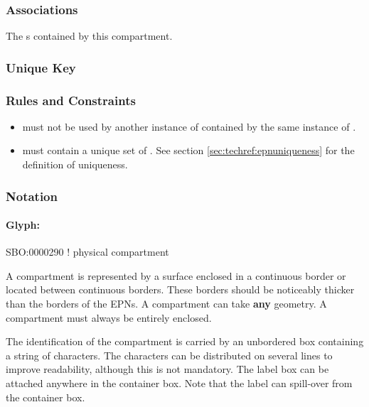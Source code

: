 \subsubsection{Associations}

\begin{attributes}
   The
  s contained by this compartment.
\end{attributes}

\subsubsection{Unique Key}

\begin{logicalkey}
  \item {}
  \item {}
\end{logicalkey}

\subsubsection{Rules and Constraints}

\begin{itemize}
\item {} must not be used by another instance of
   contained by the same instance of
  .
\item {} must contain a unique set of
  . See section \ref{sec:techref:epnuniqueness} for
  the definition of  uniqueness.
\end{itemize}

\subsubsection{Notation}

\paragraph{Glyph: }\label{sec:techref:compartment}

\begin{glyphDescription}

\glyphSboTerm  SBO:0000290 ! physical compartment

\glyphContainer A compartment is represented by a surface enclosed in a continuous border or located between continuous borders. These borders should be noticeably thicker than the borders of the EPNs. A compartment can take \textbf{any} geometry. A compartment must always be entirely enclosed.

\glyphLabel The identification of the compartment is carried by an unbordered box containing a string of characters. The characters can be distributed on several lines to improve readability, although this is not mandatory. The label box can be attached anywhere in the container box. Note that the label can spill-over from the container box.

\end{glyphDescription}

